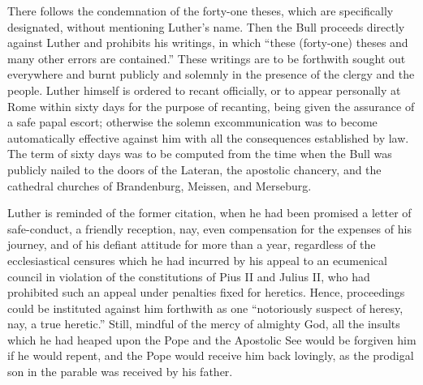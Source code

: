 There follows the condemnation of the forty-one theses, which are specifically
designated, without mentioning Luther’s name.
Then the Bull proceeds directly against Luther and prohibits his writings,
in which “these (forty-one) theses and many other errors are contained.”
These writings are to be forthwith sought out everywhere and burnt publicly
and solemnly in the presence of the clergy and the people. Luther
himself is ordered to recant officially, or to appear personally at Rome within
sixty days for the purpose of recanting, being given the assurance of a safe
papal escort; otherwise the solemn excommunication was to become automatically
effective against him with all the consequences established by law.
The term of sixty days was to be computed from the time when the Bull was
publicly nailed to the doors of the Lateran, the apostolic chancery, and
the cathedral churches of Brandenburg, Meissen, and Merseburg.

Luther is reminded of the former citation, when he had been promised a
letter of safe-conduct, a friendly reception, nay, even compensation for the
expenses of his journey, and of his defiant attitude for more than a year,
regardless of the ecclesiastical censures which he had incurred by his appeal
to an ecumenical council in violation of the constitutions of Pius II
and Julius II, who had prohibited such an appeal under penalties fixed for
heretics. Hence, proceedings could be instituted against him forthwith as
one “notoriously suspect of heresy, nay, a true heretic.” Still, mindful of the
mercy of almighty God, all the insults which he had heaped upon the Pope
and the Apostolic See would be forgiven him if he would repent, and the
Pope would receive him back lovingly, as the prodigal son in the parable
was received by his father.

